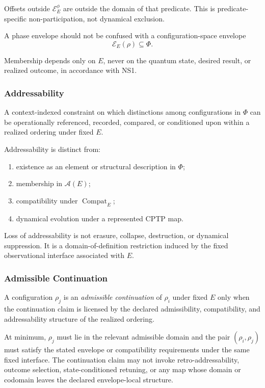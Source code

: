 \documentclass[aps,prx,onecolumn,11pt]{revtex4-2}
\theoremstyle{plain}
\theoremstyle{definition}
\theoremstyle{remark}
\newcommand{\Compat}{\operatorname{Compat}} %
\begin{document}
Offsets outside \(\mathcal E^\phi_E\) are outside the domain of that
predicate. This is predicate-specific non-participation, not dynamical
exclusion.

A phase envelope should not be confused with a configuration-space
envelope
\[
\mathcal E_E(\rho)\subseteq\Phi.
\]

Membership depends only on \(E\), never on the quantum state, desired
result, or realized outcome, in accordance with NS1.

\subsubsection*{Addressability}
\label{gloss:addressability}

A context-indexed constraint on which distinctions among configurations
in \(\Phi\) can be operationally referenced, recorded, compared, or
conditioned upon within a realized ordering under fixed \(E\).

Addressability is distinct from:

\begin{enumerate}[label=(\roman*), leftmargin=2.2em]
\item existence as an element or structural description in \(\Phi\);
\item membership in \(\mathcal A(E)\);
\item compatibility under \(\Compat_E\);
\item dynamical evolution under a represented CPTP map.
\end{enumerate}

Loss of addressability is not erasure, collapse, destruction, or
dynamical suppression. It is a domain-of-definition restriction induced
by the fixed observational interface associated with \(E\).

\subsubsection*{Admissible Continuation}
\label{gloss:admissible_continuation}

A configuration \(\rho_j\) is an \emph{admissible continuation} of
\(\rho_i\) under fixed \(E\) only when the continuation claim is licensed
by the declared admissibility, compatibility, and addressability
structure of the realized ordering.

At minimum, \(\rho_j\) must lie in the relevant admissible domain and
the pair \((\rho_i,\rho_j)\) must satisfy the stated envelope or
compatibility requirements under the same fixed interface. The
continuation claim may not invoke retro-addressability, outcome
selection, state-conditioned retuning, or any map whose domain or
codomain leaves the declared envelope-local structure.
\end{document}
